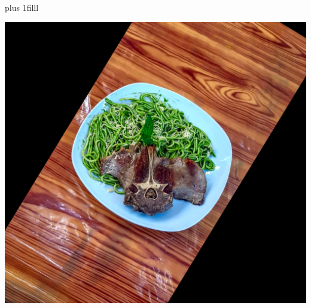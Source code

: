 \documentclass{photobook} %
\begin{document}
\maketitle
\pagestyle{empty}
\begin{minipage}{\imgwidth}%
\drawtrimcorners%
\vskip0pt plus 1filll
\begin{minipage}{\imgwidth}%
 \hfil\includegraphics[width=\imgwidth,height=\imgheight,keepaspectratio]{tallarin_verde_con_chuleta.jpg}\hfil
\end{minipage}
\end{minipage}
\newpage
\end{document}
